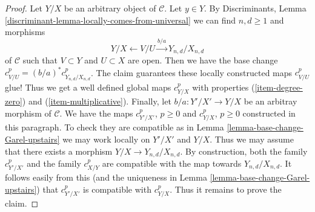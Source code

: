 \documentclass[10pt,a4paper]{amsart}
\theoremstyle{plain}
\theoremstyle{definition}
\theoremstyle{remark}
\numberwithin{equation}{subsection}
\begin{document}
\begin{proof}
\medskip\noindent
Let $Y/X$ be an arbitrary object of $\mathcal{C}$. Let $y \in Y$.
By Discriminants, Lemma \ref{discriminant-lemma-locally-comes-from-universal}
we can find $n, d \geq 1$ and morphisms
$$
Y/X \leftarrow V/U \xrightarrow{b/a} Y_{n, d}/X_{n, d}
$$
of $\mathcal{C}$ such that $V \subset Y$ and $U \subset X$ are open.
Then we have the base change $c^p_{V/U} = (b/a)^*c^p_{Y_{n, d}/X_{n, d}}$.
The claim guarantees these locally constructed maps $c^p_{V/U}$ glue!
Thus we get a well defined global maps $c^p_{Y/X}$ with properties
(\ref{item-degree-zero}) and (\ref{item-multiplicative}).
Finally, let $b/a : Y'/X' \to Y/X$ be an arbitray morphism of $\mathcal{C}$.
We have the maps $c^p_{Y'/X'}$, $p \geq 0$ and $c^p_{Y/X}$, $p \geq 0$
constructed in this paragraph. To check they are compatible as in
Lemma \ref{lemma-base-change-Garel-upstairs} we may work locally
on $Y'/X'$ and $Y/X$. Thus we may assume that there exists a morphism
$Y/X \to Y_{n, d}/X_{n, d}$. By construction, both the family
$c^p_{Y'/X'}$ and the family $c^p_{X/Y}$ are compatible with
the map towards $Y_{n, d}/X_{n, d}$. It follows easily from this
(and the uniqueness in Lemma \ref{lemma-base-change-Garel-upstairs})
that $c^p_{Y'/X'}$ is compatible with $c^p_{Y/X}$.
Thus it remains to prove the claim.


\end{proof}
\end{document}
